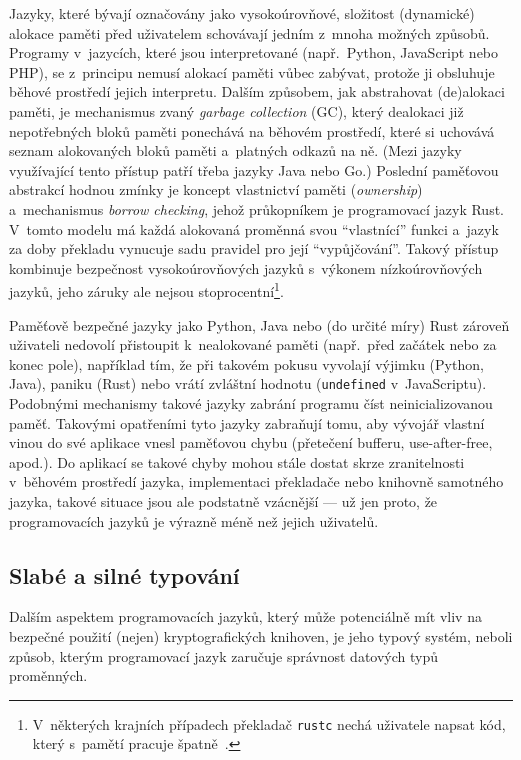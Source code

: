 Jazyky, které bývají označovány jako vysokoúrovňové, složitost (dynamické) alokace paměti před uživatelem schovávají jedním z~mnoha možných způsobů. Programy v~jazycích, které jsou interpretované (např.\ Python, JavaScript nebo PHP), se z~principu nemusí alokací paměti vůbec zabývat, protože ji obsluhuje běhové prostředí jejich interpretu. Dalším způsobem, jak abstrahovat (de)alokaci paměti, je mechanismus zvaný \textit{garbage collection} (GC), který dealokaci již nepotřebných bloků paměti ponechává na běhovém prostředí, které si uchovává seznam alokovaných bloků paměti a~platných odkazů na ně. (Mezi jazyky využívající tento přístup patří třeba jazyky Java nebo Go.) Poslední paměťovou abstrakcí hodnou zmínky je koncept vlastnictví paměti (\textit{ownership}) a~mechanismus \textit{borrow checking}, jehož průkopníkem je programovací jazyk Rust. V~tomto modelu má každá alokovaná proměnná svou ``vlastnící'' funkci a~jazyk za doby překladu vynucuje sadu pravidel pro její ``vypůjčování''. Takový přístup kombinuje bezpečnost vysokoúrovňových jazyků s~výkonem nízkoúrovňových jazyků, jeho záruky ale nejsou stoprocentní\footnote{V~některých krajních případech překladač \texttt{rustc} nechá uživatele napsat kód, který s~pamětí pracuje špatně~\cite{cvers}.}.

Paměťově bezpečné jazyky jako Python, Java nebo (do určité míry) Rust zároveň uživateli nedovolí přistoupit k~nealokované paměti (např.\ před začátek nebo za konec pole), například tím, že při takovém pokusu vyvolají výjimku (Python, Java), paniku (Rust) nebo vrátí zvláštní hodnotu (\texttt{undefined} v~JavaScriptu). Podobnými mechanismy takové jazyky zabrání programu číst neinicializovanou paměť. Takovými opatřeními tyto jazyky zabraňují tomu, aby vývojář vlastní vinou do své aplikace vnesl paměťovou chybu (přetečení bufferu, use-after-free, apod.). Do aplikací se takové chyby mohou stále dostat skrze zranitelnosti v~běhovém prostředí jazyka, implementaci překladače nebo knihovně samotného jazyka, takové situace jsou ale podstatně vzácnější --- už jen proto, že programovacích jazyků je výrazně méně než jejich uživatelů.

\subsection{Slabé a silné typování}

Dalším aspektem programovacích jazyků, který může potenciálně mít vliv na bezpečné použití (nejen) kryptografických knihoven, je jeho typový systém, neboli způsob, kterým programovací jazyk zaručuje správnost datových typů proměnných.

